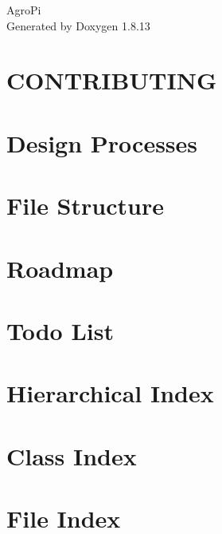 \documentclass[twoside]{book}
\newcommand{\+}{\discretionary{\mbox{\scriptsize$\hookleftarrow$}}{}{}}
\newcommand{\clearemptydoublepage}{%
  \newpage{\pagestyle{empty}\cleardoublepage}%
}
\begin{document}
\hypersetup{pageanchor=false,
             bookmarksnumbered=true,
             pdfencoding=unicode
            }
\begin{titlepage}
\vspace*{7cm}
\begin{center}%
{\Large Agro\+Pi }\\
\vspace*{1cm}
{\large Generated by Doxygen 1.8.13}\\
\end{center}
\end{titlepage}
\clearemptydoublepage
{}
\tableofcontents
\clearemptydoublepage
{}
\hypersetup{pageanchor=true}

\chapter{C\+O\+N\+T\+R\+I\+B\+U\+T\+I\+NG}
\label{md_docs_CONTRIBUTING}

\chapter{Design Processes}
\label{autotoc_md1}

\chapter{File Structure}
\label{autotoc_md28}

\chapter{Roadmap}
\label{autotoc_md29}

\chapter{Todo List}
\label{todo}

\chapter{Hierarchical Index}

\chapter{Class Index}

\chapter{File Index}

\end{document}
